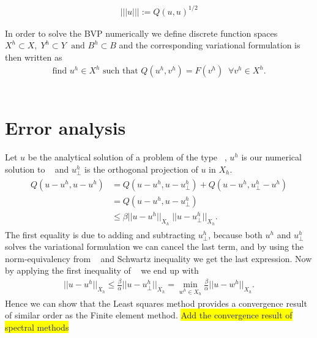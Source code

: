 \begin{align}
	||| u ||| := Q(u,u)^{1/2}
	\label{eq:energynorm}
\end{align}

In order to solve the BVP numerically we define discrete function spaces $X^h \subset X, \; Y^h\subset Y \; \text{ and } B^h \subset B $ and the corresponding variational formulation is then written as 
\begin{align}
	\text{find } u^h \in X^h \text{  such that  } Q(u^h,v^h) = F(v^h) \; \; \forall v^h\in X^h.
	\label{eq:varFormGenDisc}
\end{align}
~\cite{Bochev}
%
\section{Error analysis}
Let $u$ be the analytical solution of a problem of the type ~, $u^h$ is our numerical solution to ~ and $u^h_{\perp} $ is the orthogonal projection of $u$ in $X_h$. 
\begin{align}
	\begin{split}
	Q(u-u^h,u-u^h) &= Q(u-u^h,u-u^h_{\perp}) + Q(u-u^h,u^h_{\perp}-u^h) \\
							   &= Q(u-u^h,u-u^h_{\perp}) \\
							 	 &\leq \beta ||u-u^h||_{X_h} \; ||u-u^h_{\perp}||_{X_h}.
	\end{split}
	\label{eq:error1}
\end{align}
The first equality is due to adding and subtracting $u^h_{\perp}$, because both $u^h$ and $u^h_{\perp}$ solves the variational formulation we can cancel the last term, and by using the norm-equivalency from ~ and Schwartz inequality we get the last  expression. Now by applying the first inequality of ~ we end up with 
\begin{align}
	||u-u^h||_{X_h}\leq \frac{\beta}{\alpha}||u-u^h_{\perp}||_{X_h} = \min_{w^h \in X_h}\frac{\beta}{\alpha}||u-w^h||_{X_h}.
	\label{error_final}
\end{align}
Hence we can show that the Least squares method provides a convergence result of similar order as the Finite element method.
\colorbox{yellow}{Add the convergence result of spectral methods}

